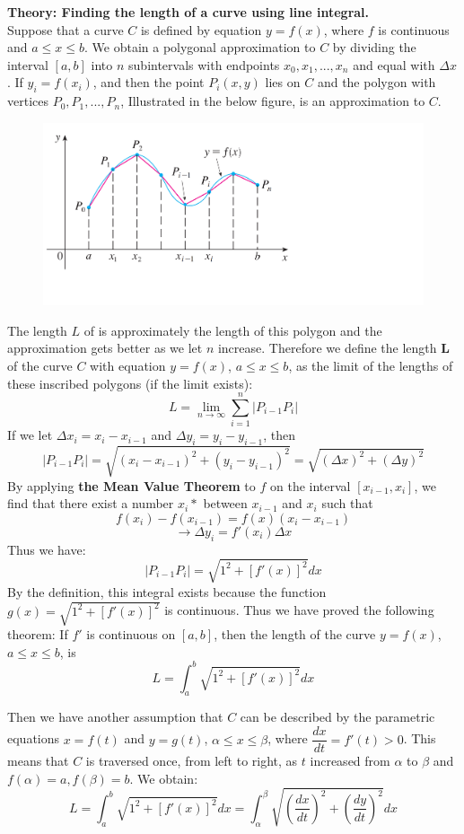 \textbf{Theory: Finding the length of a curve using line integral.} \\
Suppose that a curve $C$ is defined by equation $y=f(x)$, where $f$ is continuous and $a \leq x \leq b$. We obtain a polygonal approximation to $C$ by dividing the interval $[a,b]$ into $n$ subintervals with endpoints $x_0,x_1,...,x_n$ and equal with $\Delta x$. If $y_i=f(x_i)$, and then the point $P_i(x,y)$ lies on $C$ and the polygon with vertices $P_0,P_1,...,P_n$, Illustrated in the below figure, is an approximation to $C$.\\[6pt]
\begin{figure}[H]
  \centering
  \includegraphics[width=12cm]{graphics/3_0.png}
\end{figure}
The length $L$ of is approximately the length of this polygon and the approximation gets better as we let $n$ increase. Therefore we define the length $\mathbf{L}$ of the curve $C$ with equation $y=f(x)$, $a \leq x \leq b$, as the limit of the lengths of these inscribed polygons (if the limit exists):
$$ L = \lim_{n \to \infty} \sum_{i = 1}^{n}  \left| P_{i-1} P_i \right| $$
If we let $\Delta x_i=x_i-x_{i-1}$ and $\Delta y_i=y_i-y_{i-1}$, then
$$ \left| P_{i-1} P_i \right| = \sqrt{(x_i-x_{i-1})^2 + (y_i-y_{i-1})^2} = \sqrt{(\Delta x)^2 + (\Delta y)^2} $$
By applying \textbf{the Mean Value Theorem} to $f$ on the interval $[x_{i-1},x_i]$, we find that there exist a number $x_i*$ between $x_{i-1}$ and $x_i$ such that
$$ f(x_i)-f(x_{i-1})=f(x)(x_i-x_{i-1})$$
$$ \rightarrow \Delta y_i = f'(x_i)\Delta x $$
Thus we have:
$$ \left| P_{i-1} P_i \right| = \sqrt{1^2 + [f'(x)]^2} dx $$
By the definition, this integral exists because the function $g(x) = \sqrt{1^2 + [f'(x)]^2}$ is continuous. Thus we have proved the following theorem:
If $f'$ is continuous on $[a,b]$, then the length of the curve $y=f(x)$, $a \leq x \leq b$, is
$$ L = \int_{a}^{b} \sqrt{1^2 + \left[f'(x)\right]^2} dx  $$

Then we have another assumption that $C$ can be described by the parametric equations $x=f(t)$ and $y=g(t)$, $\alpha \leq x \leq \beta$, where \vspace{0.2cm} $\dfrac{dx}{dt}=f'(t)>0$. This means that $C$ is traversed once, from left to right, as $t$ increased from $\alpha$ to $\beta$ and $f(\alpha)=a, f(\beta)=b$. We obtain:
$$ L = \int_{a}^{b} \sqrt{1^2 + \left[f'(x)\right]^2} dx = \int_{\alpha}^{\beta} \sqrt{\left(\dfrac{dx}{dt}\right)^2 + \left(\dfrac{dy}{dt}\right)^2} dx  $$

